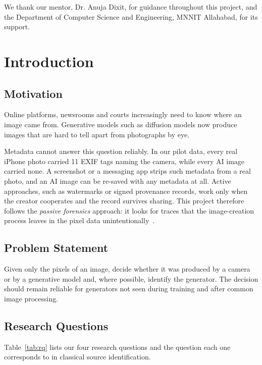 \documentclass{mnnit}
\begin{document}
We thank our mentor, Dr. Anuja Dixit, for guidance throughout this project,
and the Department of Computer Science and Engineering, MNNIT Allahabad,
for its support.
\afterpreface

\chapter{Introduction}

\section{Motivation}
Online platforms, newsrooms and courts increasingly need to know where an
image came from. Generative models such as diffusion models now produce
images that are hard to tell apart from photographs by eye.

Metadata cannot answer this question reliably. In our pilot data, every
real iPhone photo carried 11 EXIF tags naming the camera, while every AI
image carried none. A screenshot or a messaging app strips such
metadata from a real photo, and an AI image can be re-saved with any
metadata at all. Active approaches, such as watermarks or signed
provenance records, work only when the creator cooperates and the record
survives sharing. This project therefore follows the \emph{passive
forensics} approach: it looks for traces that the image-creation process
leaves in the pixel data unintentionally~\cite{verdoliva2020media}.

\section{Problem Statement}
Given only the pixels of an image, decide whether it was produced by a
camera or by a generative model and, where possible, identify the
generator. The decision should remain reliable for generators not seen
during training and after common image processing.

\section{Research Questions}
Table~\ref{tab:rq} lists our four research questions and the question each one
corresponds to in classical source identification.
\end{document}
